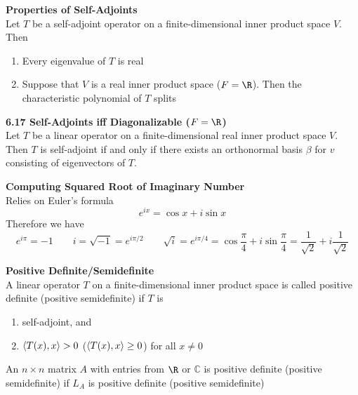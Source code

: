 \documentclass[11pt]{article}
\begin{document}
\begin{lemma*}
    \textbf{Properties of Self-Adjoints} \\ 
    Let $T$ be a self-adjoint operator on a finite-dimensional inner product space $V$. Then 
    \begin{enumerate}
        \item Every eigenvalue of $T$ is real 
        \item Suppose that $V$ is a real inner product space ($F=\R$). Then the characteristic polynomial of $T$ splits
    \end{enumerate}
\end{lemma*}


\begin{theorem*}
    \textbf{6.17 Self-Adjoints iff Diagonalizable ($F=\R$)} \\
    Let $T$ be a linear operator on a finite-dimensional real inner product space $V$. Then $T$ is self-adjoint if and only if there exists an orthonormal basis $\beta$ for $v$ consisting of eigenvectors of $T$.
\end{theorem*}


\begin{defn*}
    \textbf{Computing Squared Root of Imaginary Number} \\
    Relies on Euler's formula 
    \[
        e^{ix}=\cos x + i\sin x 
    \]
    Therefore we have 
    \[
        e^{i\pi} = -1 \qquad 
        i = \sqrt{-1} = e^{i\pi/2} \qquad 
        \sqrt{i} = e^{i \pi / 4} = \cos \frac{\pi}{4} + i \sin \frac{\pi}{4} = \frac{1}{\sqrt{2}} + i \frac{1}{\sqrt{2}}
    \]
\end{defn*}

\begin{defn*}
    \textbf{Positive Definite/Semidefinite} \\
    A linear operator $T$ on a finite-dimensional inner product space is called positive definite (positive semidefinite) if $T$ is 
    \begin{enumerate}
        \item self-adjoint, and 
        \item $\langle T(x),x\rangle >0$ ($\langle T(x),x\rangle \geq 0$) for all $x\neq 0$
    \end{enumerate}
    An $n\times n$ matrix $A$ with entries from $\R$ or $\mathbb{C}$ is positive definite (positive semidefinite) if $L_A$ is positive definite (positive semidefinite)
\end{defn*}


\end{document}
